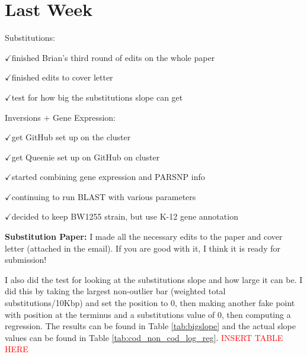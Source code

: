 \documentclass[12pt]{article}
\newcommand{\ch}{$\checkmark$}
\begin{document}

	
\section*{Last Week}

Substitutions:

\ch finished Brian's third round of edits on the whole paper

\ch finished edits to cover letter

\ch test for how big the substitutions slope can get

Inversions $+$ Gene Expression:

\ch get GitHub set up on the cluster

\ch get Queenie set up on GitHub on cluster

\ch started combining gene expression and PARSNP info

\ch continuing to run BLAST with various parameters

\ch decided to keep BW1255 strain, but use K-12 gene annotation



\textbf{Substitution Paper:} 
I made all the necessary edits to the paper and cover letter (attached in the email).
If you are good with it, I think it is ready for submission!

I also did the test for looking at the substitutions slope and how large it can be.
I did this by taking the largest non-outlier bar (weighted total substitutions/10Kbp) and set the position to 0, then making another fake point with position at the terminus and a substitutions value of 0, then computing a regression.
The results can be found in Table \ref{tab:bigslope} and the actual slope values can be found in Table \ref{tab:cod_non_cod_log_reg}. \textcolor{red}{INSERT TABLE HERE}
\end{document}
